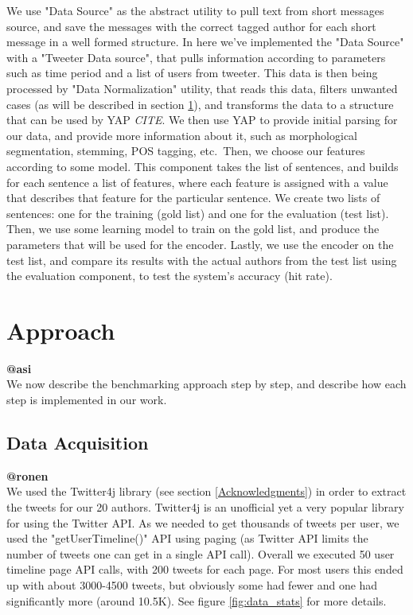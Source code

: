 \documentclass[a4paper]{article}
\begin{document}
We use "Data Source" as the abstract utility to pull text from short messages source, and save the messages with the correct tagged author for each short message in a well formed structure.
In here we've implemented the "Data Source" with a "Tweeter Data source", that pulls information according to parameters such as time period and a list of users from tweeter.
This data is then being processed by "Data Normalization" utility, that reads this data, filters unwanted cases (as will be described in section \ref{Approach}), and transforms the data to a structure that can be used by YAP \emph{CITE}.
We then use YAP to provide initial parsing for our data, and provide more information about it, such as morphological segmentation, stemming, POS tagging, etc.\
Then, we choose our features according to some model. This component takes the list of sentences, and builds for each sentence a list of features, where each feature is assigned with a value that describes that feature for the particular sentence.
We create two lists of sentences: one for the training (gold list) and one for the evaluation (test list).
Then, we use some learning model to train on the gold list, and produce the parameters that will be used for the encoder.
Lastly, we use the encoder on the test list, and compare its results with the actual authors from the test list using the evaluation component, to test the system's accuracy (hit rate).

\section{Approach}
\label{Approach}
\textbf{@asi}\\

We now describe the benchmarking approach step by step, and describe how each step is implemented in our work.
\subsection{Data Acquisition}
\textbf{@ronen}\\
We used the Twitter4j library (see section \ref{Acknowledgments}) in order to extract the tweets for our 20 authors. Twitter4j is an unofficial yet a very popular library for using the Twitter API. As we needed to get thousands of tweets per user, we used the "getUserTimeline()" API using paging (as Twitter API limits the number of tweets one can get in a single API call). Overall we executed 50 user timeline page API calls, with 200 tweets for each page. For most users this ended up with about 3000-4500 tweets, but obviously some had fewer and one had significantly more (around 10.5K). See figure \ref{fig:data_stats} for more details.
\end{document}
